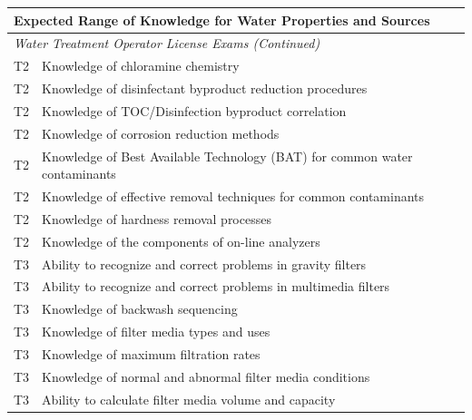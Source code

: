 \begin{table}[H]
\begin{tabular}{| m{1cm} |m{15cm} |}
\hline
\multicolumn{2}{|l|}{\textbf{Expected   Range of Knowledge for Water Properties and Sources}}                                                                      \\ \hline
\multicolumn{2}{|l|}{\textit{Water   Treatment Operator License Exams (Continued)}}                                                                  \\ \hline
T2 & Knowledge of   chloramine chemistry                                                        \\ \hline
T2 & Knowledge of   disinfectant byproduct reduction procedures                                 \\ \hline
T2 & Knowledge of   TOC/Disinfection byproduct correlation                                      \\ \hline
T2 & Knowledge of   corrosion reduction methods                                                 \\ \hline
T2 & Knowledge of Best   Available Technology (BAT) for common water contaminants               \\ \hline
T2 & Knowledge of   effective removal techniques for common contaminants                        \\ \hline
T2 & Knowledge of hardness   removal processes                                                  \\ \hline
T2 & Knowledge of the   components of on-line analyzers                                         \\ \hline
T3 & Ability to recognize   and correct problems in gravity filters                             \\ \hline
T3 & Ability to recognize   and correct problems in multimedia filters                          \\ \hline
T3 & Knowledge of backwash   sequencing                                                         \\ \hline
T3 & Knowledge of filter   media types and uses                                                 \\ \hline
T3 & Knowledge of maximum   filtration rates                                                    \\ \hline
T3 & Knowledge of normal   and abnormal filter media conditions                                 \\ \hline
T3 & Ability to calculate   filter media volume and capacity                                    \\ \hline

\end{tabular}
\end{table}
